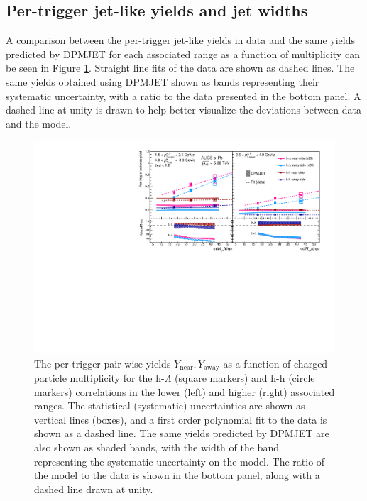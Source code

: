 \subsection{Per-trigger jet-like yields and jet widths}
\label{sec:pairwise_yields_modelcomp}

A comparison between the per-trigger jet-like yields in data and the same yields predicted by DPMJET for each associated \pt range as a function of multiplicity can be seen in Figure \ref{fig:pairwise_yield_model}. Straight line fits of the data are shown as dashed lines. The same yields obtained using DPMJET shown as bands representing their systematic uncertainty, with a ratio to the data presented in the bottom panel. A dashed line at unity is drawn to help better visualize the deviations between data and the model.

\begin{figure}[h!]
\centering
\includegraphics[width=\textwidth]{figures/results/final_pairwise_plot_new_x_axis_model_ratio.pdf}
\caption{The per-trigger pair-wise yields $Y_{\text{near}}, Y_{\text{away}}$ as a function of charged particle multiplicity for the h-$\Lambda$ (square markers) and h-h (circle markers) correlations in the lower (left) and higher (right) associated \pt ranges. The statistical (systematic) uncertainties are shown as vertical lines (boxes), and a first order polynomial fit to the data is shown as a dashed line. The same yields predicted by DPMJET are also shown as shaded bands, with the width of the band representing the systematic uncertainty on the model. The ratio of the model to the data is shown in the bottom panel, along with a dashed line drawn at unity.}
\label{fig:pairwise_yield_model}
\end{figure}

